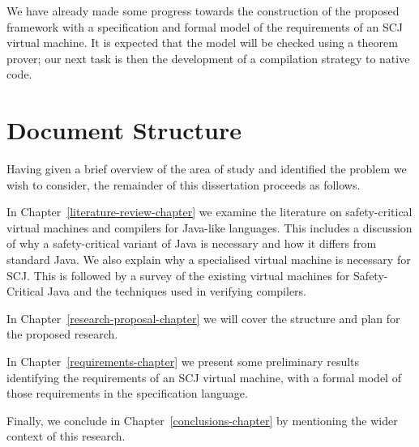 \documentclass[a4paper,10pt]{report}
\begin{document}
We have already made some progress towards the construction of the proposed
framework with a specification and formal model of the requirements of an SCJ
virtual machine.  It is expected that the model will be checked using a theorem
prover; our next task is then the development of a compilation strategy to
native code.

\section{Document Structure}

Having given a brief overview of the area of study and identified the problem we
wish to consider, the remainder of this dissertation proceeds as follows.

In Chapter~\ref{literature-review-chapter} we examine the literature on
safety-critical virtual machines and compilers for Java-like languages. This
includes a discussion of why a safety-critical variant of Java is necessary and
how it differs from standard Java.  We also explain why a specialised virtual
machine is necessary for SCJ.  This is followed by a survey of the existing
virtual machines for Safety-Critical Java and the techniques used in verifying
compilers.

In Chapter~\ref{research-proposal-chapter} we will cover the structure and
plan for the proposed research.

In Chapter~\ref{requirements-chapter} we present some preliminary results
identifying the requirements of an SCJ virtual machine, with a formal model of
those requirements in the \Circus{} specification language.

Finally, we conclude in Chapter~\ref{conclusions-chapter} by mentioning the
wider context of this research.

\end{document}

